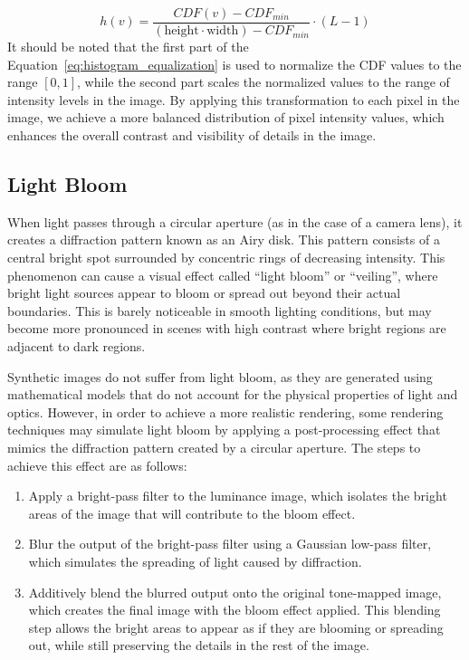 \begin{equation}
    h(v) = \frac{CDF(v) - CDF_{min}}{(\text{height}\cdot \text{width}) - CDF_{min}} \cdot (L-1)
    \label{eq:histogram_equalization}
\end{equation}
It should be noted that the first part of the Equation~\ref{eq:histogram_equalization} is used to normalize the CDF values to the range $[0,1]$, while the second part scales the normalized values to the range of intensity levels in the image. By applying this transformation to each pixel in the image, we achieve a more balanced distribution of pixel intensity values, which enhances the overall contrast and visibility of details in the image.


\subsection{Light Bloom}
When light passes through a circular aperture (as in the case of a camera lens), it creates a diffraction pattern known as an Airy disk. This pattern consists of a central bright spot surrounded by concentric rings of decreasing intensity. This phenomenon can cause a visual effect called ``light bloom'' or ``veiling'', where bright light sources appear to bloom or spread out beyond their actual boundaries. This is barely noticeable in smooth lighting
conditions, but may become more pronounced in scenes with high contrast where bright regions are adjacent to dark regions.


Synthetic images do not suffer from light bloom, as they are generated using mathematical models that do not account for the physical properties of light and optics. However, in order to achieve a more realistic rendering, some rendering techniques may simulate light bloom by applying a post-processing effect that mimics the diffraction pattern created by a circular aperture. The steps to achieve this effect are as follows:
\begin{enumerate}
    \item Apply a bright-pass filter to the luminance image, which isolates the bright areas of the image that will contribute to the bloom effect.
    \item Blur the output of the bright-pass filter using a Gaussian low-pass filter, which simulates the spreading of light caused by diffraction.
    \item Additively blend the blurred output onto the original tone-mapped image, which creates the final image with the bloom effect applied. This blending step allows the bright areas to appear as if they are blooming or spreading out, while still preserving the details in the rest of the image.
\end{enumerate}

